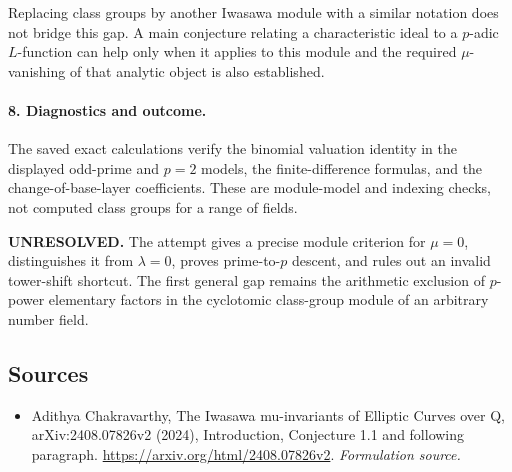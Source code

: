 \documentclass[11pt]{article}
\begin{document}
Replacing class groups by another Iwasawa module with a similar notation does not bridge this gap. A main conjecture relating a characteristic ideal to a $p$-adic $L$-function can help only when it applies to this module and the required $\mu$-vanishing of that analytic object is also established.

\paragraph{8. Diagnostics and outcome.}
The saved exact calculations verify the binomial valuation identity in the displayed odd-prime and $p=2$ models, the finite-difference formulas, and the change-of-base-layer coefficients. These are module-model and indexing checks, not computed class groups for a range of fields.

\textbf{UNRESOLVED.} The attempt gives a precise module criterion for $\mu=0$, distinguishes it from $\lambda=0$, proves prime-to-$p$ descent, and rules out an invalid tower-shift shortcut. The first general gap remains the arithmetic exclusion of $p$-power elementary factors in the cyclotomic class-group module of an arbitrary number field.

\subsection{Sources}
\begin{itemize}
\item[S1]Adithya Chakravarthy, The Iwasawa mu-invariants of Elliptic Curves over Q, arXiv:2408.07826v2 (2024), Introduction, Conjecture 1.1 and following paragraph.
\url{https://arxiv.org/html/2408.07826v2}.
\textit{Formulation source.}
\end{itemize}
\end{document}
